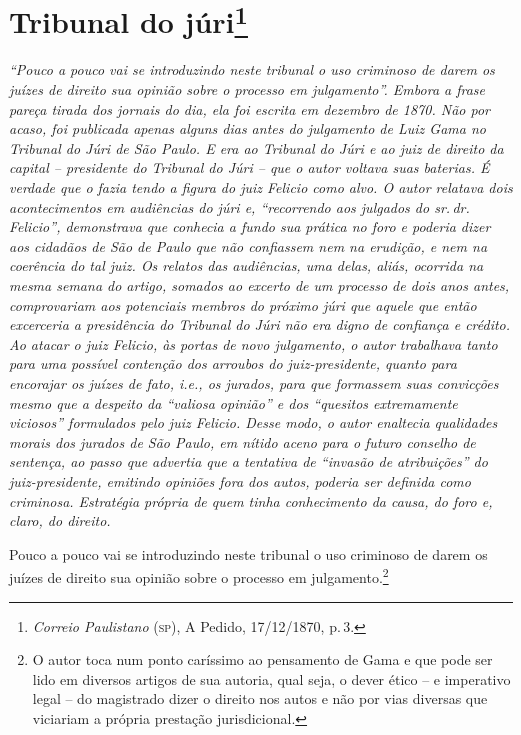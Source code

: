 \chapter{Tribunal do júri\footnote{\emph{Correio Paulistano} (\textsc{sp}), A Pedido, 17/12/1870,
  p.\,3.}} %

\begin{didascalia}
\emph{``Pouco a pouco vai se introduzindo neste tribunal o uso criminoso
de darem os juízes de direito sua opinião sobre o processo em
julgamento''. Embora a frase pareça tirada dos jornais do dia, ela foi
escrita em dezembro de 1870. Não por acaso, foi publicada apenas alguns
dias antes do julgamento de Luiz Gama no Tribunal do Júri de São Paulo.
E era ao Tribunal do Júri e ao juiz de direito da capital -- presidente
do Tribunal do Júri -- que o autor voltava suas baterias. É verdade que
o fazia tendo a figura do juiz Felicio como alvo. O autor relatava dois
acontecimentos em audiências do júri e, ``recorrendo aos julgados do sr.\,dr.\,Felicio'', demonstrava que conhecia a fundo sua prática no foro e
poderia dizer aos cidadãos de São de Paulo que não confiassem nem na
erudição, e nem na coerência do tal juiz. Os relatos das audiências, uma
delas, aliás, ocorrida na mesma semana do artigo, somados ao excerto de
um processo de dois anos antes, comprovariam aos potenciais membros do
próximo júri que aquele que então excerceria a presidência do Tribunal
do Júri não era digno de confiança e crédito. Ao atacar o juiz Felicio,
às portas de novo julgamento, o autor trabalhava tanto para uma possível
contenção dos arroubos do juiz-presidente, quanto para encorajar os
juízes de fato, i.e., os jurados, para que formassem suas convicções
mesmo que a despeito da ``valiosa opinião'' e dos ``quesitos extremamente
viciosos'' formulados pelo juiz Felicio. Desse modo, o autor enaltecia
qualidades morais dos jurados de São Paulo, em nítido aceno para o
futuro conselho de sentença, ao passo que advertia que a tentativa de
``invasão de atribuições'' do juiz-presidente, emitindo opiniões fora dos
autos, poderia ser definida como criminosa. Estratégia própria de quem
tinha conhecimento da causa, do foro e, claro, do direito.}
\end{didascalia}

Pouco a pouco vai se introduzindo neste tribunal o uso criminoso de
darem os juízes de direito sua opinião sobre o processo em
julgamento.\footnote{ O autor toca num ponto caríssimo ao pensamento de
  Gama e que pode ser lido em diversos artigos de sua autoria, qual
  seja, o dever ético -- e imperativo legal -- do magistrado dizer o
  direito nos autos e não por vias diversas que viciariam a própria
  prestação jurisdicional.}

